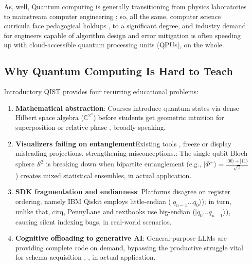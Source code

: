 \documentclass[conference]{IEEEtran}
\begin{document}
As, well, Quantum computing is generally transitioning from physics laboratories to mainstream computer engineering \cite{b1}; so, all the same, computer science curricula face pedagogical holdups \cite{b3}, to a significant degree, and industry demand for engineers capable of algorithm design and error mitigation is often speeding up \cite{b2} with cloud-accessible quantum processing units (QPUs), on the whole.

\subsection{Why Quantum Computing Is Hard to Teach}
Introductory QIST provides four recurring educational problems:
\begin{enumerate}[leftmargin=*,noitemsep,topsep=1pt]
    \item \textbf{Mathematical abstraction}: Courses introduce quantum states via dense Hilbert space algebra ($\mathbb{C}^{2^n}$) before students get geometric intuition for superposition or relative phase \cite{b4}, broadly speaking.
    \item \textbf{Visualizers failing on entanglement}Existing tools \cite{b5}, \cite{b6} freeze or display misleading projections, strengthening misconceptions.: The single-qubit Bloch sphere $\mathcal{S}^2$ is breaking down when bipartite entanglement (e.g., $|\Phi^+\rangle = \frac{|00\rangle + |11\rangle}{\sqrt{2}}$) creates mixed statistical ensembles, in actual application.
    \item \textbf{SDK fragmentation and endianness}: Platforms disagree on register ordering, namely IBM Qiskit employs little-endian ($|q_{n-1} \dots q_0\rangle$); in turn, unlike that, cirq, PennyLane and textbooks use big-endian ($|q_0 \dots q_{n-1}\rangle$), causing silent indexing bugs, in real-world scenarios.
    \item \textbf{Cognitive offloading to generative AI}: General-purpose LLMs are providing complete code on demand, bypassing the productive struggle vital for schema acquisition \cite{b7}, \cite{b8}, in actual application.
\end{enumerate}
\end{document}
